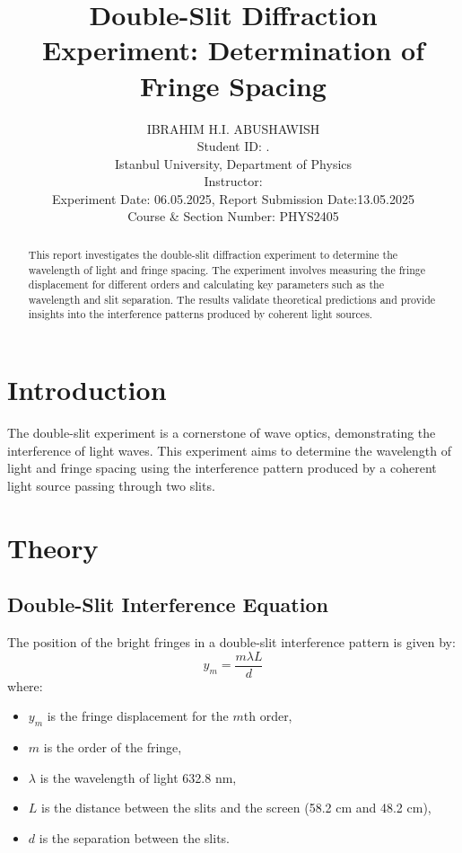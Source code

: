 \documentclass[journal]{IEEEtran}
\begin{document}
\title{Double-Slit Diffraction Experiment: Determination of Fringe Spacing}
\author{IBRAHIM H.I. ABUSHAWISH \\

{\small Student ID: \hspace{1.5cm}. \\ 
Istanbul University, Department of Physics \\
Instructor: \\
Experiment Date: 06.05.2025, Report Submission Date:13.05.2025 \\
Course \& Section Number: PHYS2405}}


\maketitle

\begin{abstract}
    This report investigates the double-slit diffraction experiment to determine the wavelength of light and fringe spacing. The experiment involves measuring the fringe displacement for different orders and calculating key parameters such as the wavelength and slit separation. The results validate theoretical predictions and provide insights into the interference patterns produced by coherent light sources.
\end{abstract}

\section{Introduction}
The double-slit experiment is a cornerstone of wave optics, demonstrating the interference of light waves. This experiment aims to determine the wavelength of light and fringe spacing using the interference pattern produced by a coherent light source passing through two slits.

\section{Theory}

\subsection{Double-Slit Interference Equation}
The position of the bright fringes in a double-slit interference pattern is given by:
\begin{equation}
    y_m = \frac{m \lambda L}{d}
    \label{eq:double_slit}
\end{equation}
where:
\begin{itemize}
    \item $y_m$ is the fringe displacement for the $m$th order,
    \item $m$ is the order of the fringe,
    \item $\lambda$ is the wavelength of light 632.8 nm, 
    \item $L$ is the distance between the slits and the screen (58.2 cm and 48.2 cm),
    \item $d$ is the separation between the slits.
\end{itemize}
\end{document}
